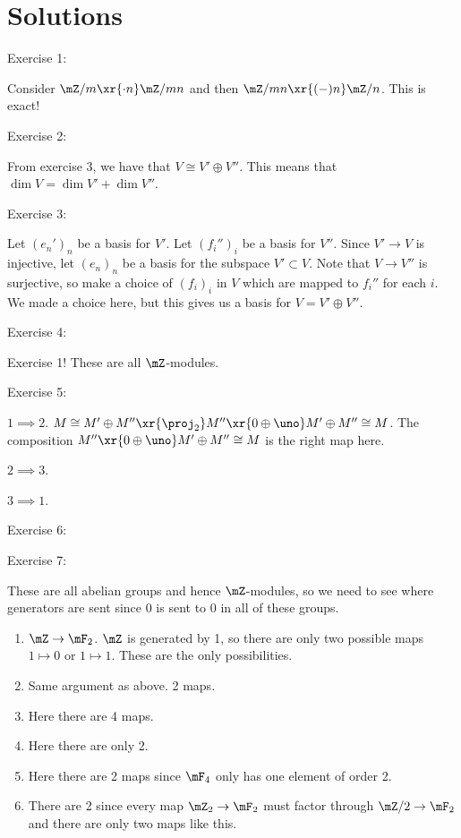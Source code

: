 \section*{Solutions}

\noindent Exercise 1: 

Consider $\mZ/m\xr{\cdot n}\mZ/mn$ and then $\mZ/mn\xr{(-)n}\mZ/n$. This is exact!

\lineyspace

\noindent Exercise 2:

From exercise 3, we have that $V\cong V'\oplus V''$. This means that $\dim V = \dim V' + \dim V''$. 

\lineyspace

\noindent Exercise 3: 

Let $(e_n')_n$ be a basis for $V'$. Let $(f_i'')_i$ be a basis for $V''$. Since $V'\to V$ is injective, let $(e_n)_n$ be a basis for the subspace $V'\subset V$. Note that $V\to V''$ is surjective, so make a choice of $(f_i)_i$ in $V$ which are mapped to $f_i''$ for each $i$. We made a choice here, but this gives us a basis for $V = V'\oplus V''$. 

\lineyspace

\noindent Exercise 4: 

Exercise 1! These are all $\mZ$-modules. 

\lineyspace

\noindent Exercise 5:

$1\implies 2$. $M \cong M'\oplus M''\xr{\proj_2}M''\xr{0\oplus \uno} M'\oplus M'' \cong M$. The composition $M''\xr{0\oplus \uno} M'\oplus M'' \cong M$ is the right map here. 

$2\implies 3$. 

$3\implies 1$.

\lineyspace

\noindent Exercise 6:

\lineyspace

\noindent Exercise 7:

These are all abelian groups and hence $\mZ$-modules, so we need to see where generators are sent since $0$ is sent to $0$ in all of these groups.

\begin{enumerate}
    \item $\mZ\to \mF_2$. $\mZ$ is generated by 1, so there are only two possible maps $1\mapsto 0$ or $1\mapsto 1$. These are the only possibilities.
    \item Same argument as above. 2 maps. 
    \item Here there are 4 maps. 
    \item Here there are only 2. 
    \item Here there are 2 maps since $\mF_4$ only has one element of order 2. 
    \item There are 2 since every map $\mZ_2\to \mF_2$ must factor through $\mZ/2\to \mF_2$ and there are only two maps like this. 
\end{enumerate}

